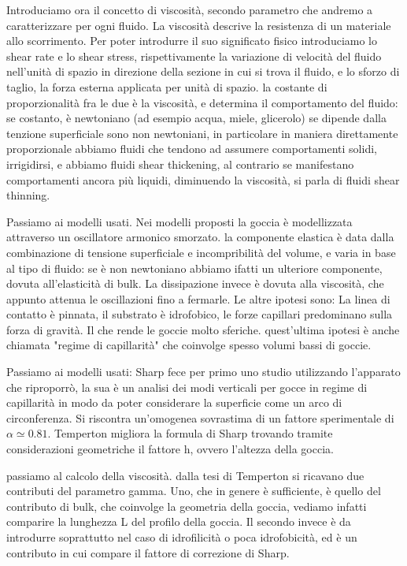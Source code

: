 Introduciamo ora il concetto di viscosità, secondo parametro che andremo a caratterizzare per ogni fluido. La viscosità descrive la resistenza di un materiale allo scorrimento.  Per poter introdurre il suo significato fisico introduciamo lo shear rate e lo shear stress, rispettivamente la variazione di velocità del fluido nell'unità di spazio in direzione della sezione in cui si trova il fluido, e lo sforzo di taglio, la forza esterna applicata per unità di spazio. la costante di proporzionalità fra le due è la viscosità, e determina il comportamento del fluido: se costanto, è newtoniano (ad esempio acqua, miele, glicerolo) se dipende dalla tenzione superficiale sono non newtoniani, in particolare in maniera direttamente proporzionale abbiamo fluidi che tendono ad assumere comportamenti solidi, irrigidirsi, e abbiamo fluidi shear thickening, al contrario se manifestano comportamenti ancora più liquidi, diminuendo la viscosità, si parla di fluidi shear thinning.

Passiamo ai modelli usati. Nei modelli proposti la goccia è modellizzata attraverso un oscillatore armonico smorzato. la componente elastica è data dalla combinazione di tensione superficiale e incompribilità del volume, e varia in base al tipo di fluido: se è non newtoniano abbiamo ifatti un ulteriore componente, dovuta all'elasticità di bulk. La dissipazione invece è dovuta alla viscosità, che appunto attenua le oscillazioni fino a fermarle.
Le altre ipotesi sono: La linea di contatto è pinnata, il substrato è idrofobico, le forze capillari predominano sulla forza di gravità. Il che rende le goccie molto sferiche. quest'ultima ipotesi è anche chiamata "regime di capillarità" che coinvolge spesso volumi bassi di goccie.

Passiamo ai modelli usati:
Sharp fece per primo uno studio utilizzando l'apparato che riproporrò, la sua è un analisi dei modi verticali per gocce in regime di capillarità in modo da poter considerare la superficie come un arco di circonferenza. Si riscontra un'omogenea sovrastima di un fattore sperimentale di $\alpha\simeq0.81$.
Temperton migliora la formula di Sharp trovando tramite considerazioni geometriche il fattore h, ovvero l'altezza della goccia.

passiamo al calcolo della viscosità. dalla tesi di Temperton si ricavano due contributi del parametro gamma. Uno, che in genere è sufficiente, è quello del contributo di bulk, che coinvolge la geometria della goccia, vediamo infatti comparire la lunghezza L del profilo della goccia. Il secondo invece è da introdurre soprattutto nel caso di idrofilicità o poca idrofobicità, ed è un contributo in cui compare il fattore di correzione di Sharp.

